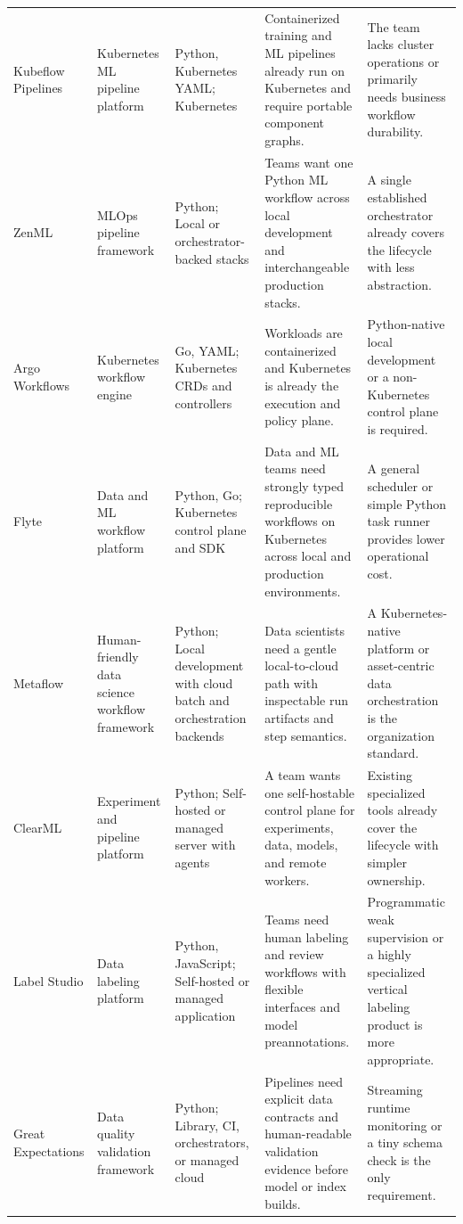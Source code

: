 \begin{longtable}{@{}p{20mm}p{22mm}p{26mm}p{46mm}p{46mm}@{}}
Kubeflow Pipelines & Kubernetes ML pipeline platform & Python, Kubernetes YAML; Kubernetes & Containerized training and ML pipelines already run on Kubernetes and require portable component graphs. & The team lacks cluster operations or primarily needs business workflow durability.\\
ZenML & MLOps pipeline framework & Python; Local or orchestrator-backed stacks & Teams want one Python ML workflow across local development and interchangeable production stacks. & A single established orchestrator already covers the lifecycle with less abstraction.\\
Argo Workflows & Kubernetes workflow engine & Go, YAML; Kubernetes CRDs and controllers & Workloads are containerized and Kubernetes is already the execution and policy plane. & Python-native local development or a non-Kubernetes control plane is required.\\
Flyte & Data and ML workflow platform & Python, Go; Kubernetes control plane and SDK & Data and ML teams need strongly typed reproducible workflows on Kubernetes across local and production environments. & A general scheduler or simple Python task runner provides lower operational cost.\\
Metaflow & Human-friendly data science workflow framework & Python; Local development with cloud batch and orchestration backends & Data scientists need a gentle local-to-cloud path with inspectable run artifacts and step semantics. & A Kubernetes-native platform or asset-centric data orchestration is the organization standard.\\
ClearML & Experiment and pipeline platform & Python; Self-hosted or managed server with agents & A team wants one self-hostable control plane for experiments, data, models, and remote workers. & Existing specialized tools already cover the lifecycle with simpler ownership.\\
Label Studio & Data labeling platform & Python, JavaScript; Self-hosted or managed application & Teams need human labeling and review workflows with flexible interfaces and model preannotations. & Programmatic weak supervision or a highly specialized vertical labeling product is more appropriate.\\
Great Expectations & Data quality validation framework & Python; Library, CI, orchestrators, or managed cloud & Pipelines need explicit data contracts and human-readable validation evidence before model or index builds. & Streaming runtime monitoring or a tiny schema check is the only requirement.\\

\end{longtable}
